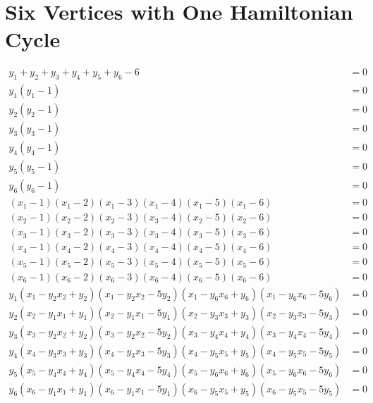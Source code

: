 \documentclass[letterpaper]{article}
\newcommand{\aln}[1]{\begin{align*} #1 \end{align*}} %
\begin{document}
\section{Six Vertices with One Hamiltonian Cycle}
\begin{center}
\end{center}
\aln{
	y_1 + y_2 + y_3 + y_4 + y_5 + y_6 - 6 &= 0\\
	y_1(y_1 - 1) &= 0\\
	y_2(y_2 - 1) &= 0\\
	y_3(y_3 - 1) &= 0\\
	y_4(y_4 - 1) &= 0\\
	y_5(y_5 - 1) &= 0\\
	y_6(y_6 - 1) &= 0\\
	(x_1 - 1)(x_1 - 2)(x_1 - 3)(x_1 - 4)(x_1 - 5)(x_1 - 6) &= 0\\
	(x_2 - 1)(x_2 - 2)(x_2 - 3)(x_3 - 4)(x_2 - 5)(x_2 - 6) &= 0\\
	(x_3 - 1)(x_3 - 2)(x_3 - 3)(x_3 - 4)(x_3 - 5)(x_3 - 6) &= 0\\
	(x_4 - 1)(x_4 - 2)(x_4 - 3)(x_4 - 4)(x_4 - 5)(x_4 - 6) &= 0\\
	(x_5 - 1)(x_5 - 2)(x_5 - 3)(x_5 - 4)(x_5 - 5)(x_5 - 6) &= 0\\
	(x_6 - 1)(x_6 - 2)(x_6 - 3)(x_6 - 4)(x_6 - 5)(x_6 - 6) &= 0\\
	y_1 (x_1 - y_2 x_2 + y_2)(x_1 - y_2 x_2 - 5y_2)(x_1 - y_6 x_6 + y_6)(x_1 - y_6 x_6 - 5y_6) &= 0\\
	y_2 (x_2 - y_1 x_1 + y_1)(x_2 - y_1 x_1 - 5y_1)(x_2 - y_3 x_3 + y_3)(x_2 - y_3 x_3 - 5y_3) &= 0\\
	y_3 (x_3 - y_2 x_2 + y_2)(x_3 - y_2 x_2 - 5y_2)(x_3 - y_4 x_4 + y_4)(x_3 - y_4 x_4 - 5y_4) &= 0\\
	y_4 (x_4 - y_3 x_3 + y_3)(x_4 - y_3 x_3 - 5y_3)(x_4 - y_5 x_5 + y_5)(x_4 - y_5 x_5 - 5y_5) &= 0\\
	y_5 (x_5 - y_4 x_4 + y_4)(x_5 - y_4 x_4 - 5y_4)(x_5 - y_6 x_6 + y_6)(x_5 - y_6 x_6 - 5y_6) &= 0\\
	y_6 (x_6 - y_1 x_1 + y_1)(x_6 - y_1 x_1 - 5y_1)(x_6 - y_5 x_5 + y_5)(x_6 - y_5 x_5 - 5y_5) &= 0
}


\newpage
\end{document}
